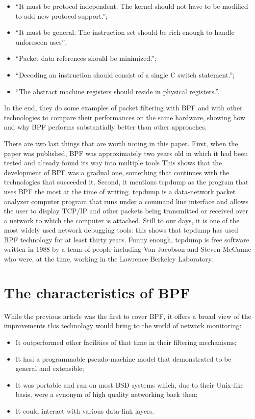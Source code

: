 \begin{itemize}
	\item ``It must be protocol independent. The kernel should not have to be modified 
		to add new protocol support.'';
	\item ``It must be general. The instruction set should be rich enough to handle unforeseen uses'';
	\item ``Packet data references should be minimized.'';
	\item ``Decoding an instruction should consist of a single C switch statement.'';
	\item ``The abstract machine registers should reside in physical registers.''.
\end{itemize}

In the end, they do some examples of packet filtering with BPF and with other technologies to compare their performances on the same hardware, showing how and why BPF performs substantially better than other approaches.

There are two last things that are worth noting in this paper.
First, when the paper was published, BPF was approximately two years old in which it had been tested and already found its way into multiple tools
This shows that the development of BPF was a gradual one, something that continues with the technologies that succeeded it.
Second, it mentions tcpdump as the program that uses BPF the most at the time of writing.
tcpdump is a data-network packet analyzer computer program that runs under a command line interface and allows the user to display TCP/IP and other packets being transmitted or received over a network to which the computer is attached.
Still to our days, it is one of the most widely used network debugging tools: this shows that tcpdump has used BPF technology for at least thirty years.
Funny enough, tcpdump is free software written in 1988 by a team of people including Van Jacobson and Steven McCanne who were, at the time, working in the Lawrence Berkeley Laboratory.

\section{The characteristics of BPF}

While the previous article was the first to cover BPF, it offers a broad view of the improvements this technology would bring to the world of network monitoring:

\begin{itemize}
	\item It outperformed other facilities of that time in their filtering mechanisms;
	\item It had a programmable pseudo-machine model that demonstrated to be general 
		and extensible;
	\item It was portable and ran on most BSD systems which, due to 
		their Unix-like basis, were a synonym of high quality networking back then;
	\item It could interact with various data-link layers.
\end{itemize}

